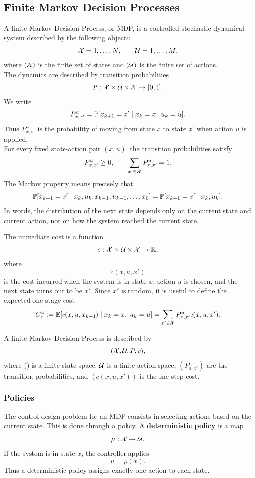 \subsection{Finite Markov Decision Processes}

A finite Markov Decision Process, or MDP, is a controlled stochastic dynamical system described
by the following objects:
\[
\mathcal{X} = {1,\dots,N},
\qquad
\mathcal{U} = {1,\dots,M},
\]
where $(\mathcal{X})$ is the finite set of states and $(\mathcal{U})$ is the finite set of actions.\\
The dynamics are described by transition probabilities
\[
P : \mathcal{X} \times \mathcal{U} \times \mathcal{X} \to [0,1].
\]
We write
\[
P^u_{x,x'}
=
\mathbb{P}[x_{k+1}=x' \mid x_k=x,\ u_k=u].
\]
Thus \(P^u_{x,x'}\) is the probability of moving from state \(x\) to state \(x'\) when action
\(u\) is applied.\\
For every fixed state-action pair \((x,u)\), the transition probabilities satisfy
\[
P^u_{x,x'} \ge 0,
\qquad
\sum_{x'\in\mathcal{X}} P^u_{x,x'} = 1.
\]
The Markov property means precisely that
\[
\mathbb{P}[x_{k+1}=x' \mid x_k,u_k,x_{k-1},u_{k-1},\dots,x_0]
=
\mathbb{P}[x_{k+1}=x' \mid x_k,u_k].
\]
In words, the distribution of the next state depends only on the current state and current
action, not on how the system reached the current state.

The immediate cost is a function
\[
c:\mathcal{X} \times \mathcal{U} \times \mathcal{X} \to \mathbb{R},
\]
where
\[
c(x,u,x')
\]
is the cost incurred when the system is in state \(x\), action \(u\) is chosen, and the next state
turns out to be \(x'\). Since \(x'\) is random, it is useful to define the expected one-stage cost
\[
C_x^u
:=
\mathbb{E}[c(x,u,x_{k+1}) \mid x_k=x,\ u_k=u]
=
\sum_{x'\in\mathcal{X}} P^u_{x,x'} c(x,u,x').
\]

\begin{theorembox}
A finite Markov Decision Process is described by
\[
(\mathcal{X},\mathcal{U},P,c),
\]
where (\cX) is a finite state space, \(\mathcal{U}\) is a finite action space, \((P^u_{x,x'})\) are the
transition probabilities, and \((c(x,u,x'))\) is the one-step cost.
\end{theorembox}

\subsubsection{Policies}

The control design problem for an MDP consists in selecting actions based on the current state.
This is done through a policy. A \textbf{deterministic policy} is a map
\[
\mu:\mathcal{X} \to \mathcal{U}.
\]
If the system is in state \(x\), the controller applies
\[
u = \mu(x).
\]
Thus a deterministic policy assigns exactly one action to each state.\\

